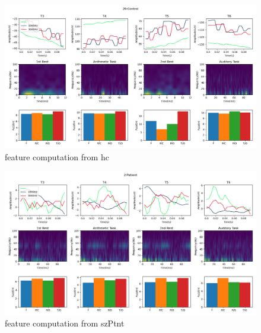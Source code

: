 \documentclass[10pt]{article}
\begin{document}
\begin{landscape}
  \begin{figure}
    \includegraphics[width=7.2in]{images/control.png}
    \caption{feature computation from \gls{hc}}
    \label{control features}
  \end{figure}
\end{landscape}
\begin{landscape}
  \begin{figure}
    \includegraphics[width=7.2in]{images/patient.png}
    \caption{feature computation from \gls{szPtnt}}
    \label{patient features}
  \end{figure}
\end{landscape}
\end{document}
